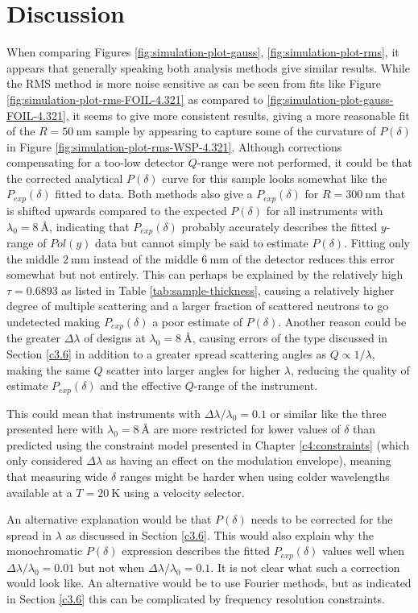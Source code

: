 \section{Discussion}
When comparing Figures \ref{fig:simulation-plot-gauss}, \ref{fig:simulation-plot-rms}, it appears that generally speaking both analysis methods give similar results. While the RMS method is more noise sensitive as can be seen from fits like Figure \ref{fig:simulation-plot-rms-FOIL-4.321} as compared to \ref{fig:simulation-plot-gauss-FOIL-4.321}, it seems to give more consistent results, giving a more reasonable fit of the $R=\SI{50}{\nano\meter}$ sample by appearing to capture some of the curvature of $P(\delta)$ in Figure \ref{fig:simulation-plot-rms-WSP-4.321}. Although corrections compensating for a too-low detector $Q$-range \cite{kusmin2017} were not performed, it could be that the corrected analytical $P(\delta)$ curve for this sample looks somewhat like the $P_{exp}(\delta)$ fitted to data. Both methods also give a $P_{exp}(\delta)$ for $R = \SI{300}{\nano\meter}$ that is shifted upwards compared to the expected $P(\delta)$ for all instruments with $\lambda_0 = \SI{8}{\angstrom}$, indicating that $P_{exp}(\delta)$ probably accurately describes the fitted $y$-range of $Pol(y)$ data but cannot simply be said to estimate $P(\delta)$. Fitting only the middle $\SI{2}{\milli\meter}$ instead of the middle $\SI{6}{\milli\meter}$ of the detector reduces this error somewhat but not entirely. This can perhaps be explained by the relatively high $\tau = 0.6893$ as listed in Table \ref{tab:sample-thickness}, causing a relatively higher degree of multiple scattering and a larger fraction of scattered neutrons to go undetected making $P_{exp}(\delta)$ a poor estimate of $P(\delta)$. Another reason could be the greater $\Delta\lambda$ of designs at $\lambda_0 = \SI{8}{\angstrom}$, causing errors of the type discussed in Section \ref{c3.6} in addition to a greater spread scattering angles as $Q\propto 1/\lambda$, making the same $Q$ scatter into larger angles for higher $\lambda$, reducing the quality of estimate $P_{exp}(\delta)$ and the effective $Q$-range of the instrument.

This could mean that instruments with $\Delta\lambda/\lambda_0 = 0.1$ or similar like the three presented here with $\lambda_0 = \SI{8}{\angstrom}$ are more restricted for lower values of $\delta$ than predicted using the constraint model presented in Chapter \ref{c4:constraints} (which only considered $\Delta\lambda$ as having an effect on the modulation envelope), meaning that measuring wide $\delta$ ranges might be harder when using colder wavelengths available at a $T=\SI{20}{\kelvin}$ using a velocity selector. 

An alternative explanation would be that $P(\delta)$ needs to be corrected for the spread in $\lambda$ as discussed in Section \ref{c3.6}. This would also explain why the monochromatic $P(\delta)$ expression describes the fitted $P_{exp}(\delta)$ values well when $\Delta\lambda/\lambda_0 = 0.01$ but not when $\Delta\lambda/\lambda_0 = 0.1$. It is not clear what such a correction would look like. An alternative would be to use Fourier methods, but as indicated in Section \ref{c3.6} this can be complicated by frequency resolution constraints.